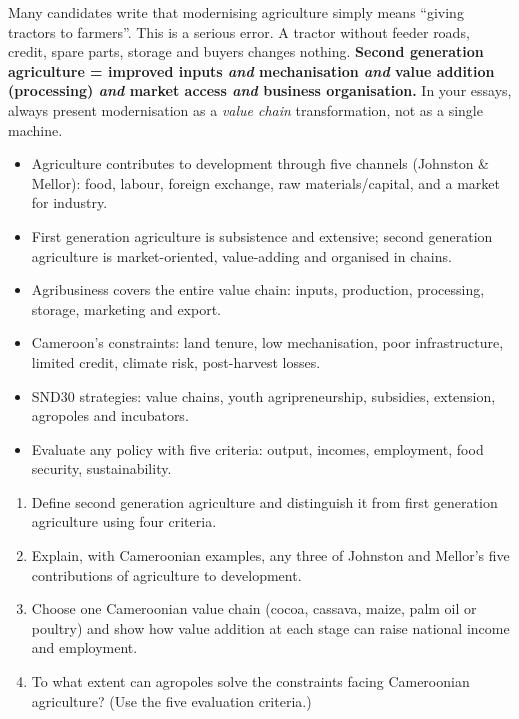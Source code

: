 \documentclass[11pt]{article}
\begin{document}
\begin{attention}
Many candidates write that modernising agriculture simply means ``giving tractors to farmers''. This is a serious error. A tractor without feeder roads, credit, spare parts, storage and buyers changes nothing. \textbf{Second generation agriculture = improved inputs \emph{and} mechanisation \emph{and} value addition (processing) \emph{and} market access \emph{and} business organisation.} In your essays, always present modernisation as a \emph{value chain} transformation, not as a single machine.
\end{attention}

\begin{aretenir}
\begin{itemize}
\item Agriculture contributes to development through five channels (Johnston \& Mellor): food, labour, foreign exchange, raw materials/capital, and a market for industry.
\item First generation agriculture is subsistence and extensive; second generation agriculture is market-oriented, value-adding and organised in chains.
\item Agribusiness covers the entire value chain: inputs, production, processing, storage, marketing and export.
\item Cameroon's constraints: land tenure, low mechanisation, poor infrastructure, limited credit, climate risk, post-harvest losses.
\item SND30 strategies: value chains, youth agripreneurship, subsidies, extension, agropoles and incubators.
\item Evaluate any policy with five criteria: output, incomes, employment, food security, sustainability.
\end{itemize}
\end{aretenir}

\begin{exercice}
\begin{enumerate}
\item Define second generation agriculture and distinguish it from first generation agriculture using four criteria.
\item Explain, with Cameroonian examples, any three of Johnston and Mellor's five contributions of agriculture to development.
\item Choose one Cameroonian value chain (cocoa, cassava, maize, palm oil or poultry) and show how value addition at each stage can raise national income and employment.
\item To what extent can agropoles solve the constraints facing Cameroonian agriculture? (Use the five evaluation criteria.)
\end{enumerate}
\end{exercice}
\end{document}
